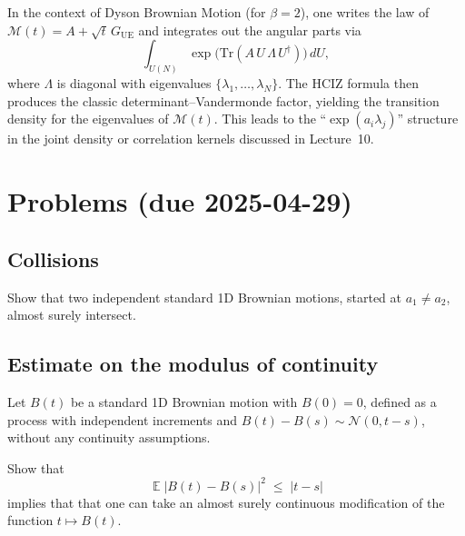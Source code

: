 \documentclass[letterpaper,11pt,oneside,reqno]{article}
\numberwithin{equation}{section}
\theoremstyle{definition}
\begin{document}
In the context of Dyson Brownian Motion (for \(\beta=2\)), one writes the law of
\(\mathcal{M}(t)=A+\sqrt{t}\,G_{\mathrm{UE}}\) and integrates out the angular parts via
\[
   \int_{U(N)}
   \exp\!\bigl(\mathrm{Tr}(A\,U\,\Lambda\,U^\dagger)\bigr)\,dU,
\]
where \(\Lambda\) is diagonal with eigenvalues \(\{\lambda_1,\dots,\lambda_N\}\).  The HCIZ formula then produces the classic determinant--Vandermonde factor, yielding the transition density for the eigenvalues of \(\mathcal{M}(t)\).  This leads to the ``\(\exp(a_i\lambda_j)\)'' structure in the joint density or correlation kernels discussed in Lecture~10.












\appendix
\setcounter{section}{9}
\section{Problems (due 2025-04-29)}

\subsection{Collisions}

Show that two independent standard 1D Brownian motions, started at $a_1\neq a_2$, almost surely intersect.

\subsection{Estimate on the modulus of continuity}

Let $B(t)$ be a standard 1D Brownian motion with $B(0)=0$,
defined as a process with independent increments and $B(t)-B(s)\sim \mathcal{N}(0,t-s)$,
without any continuity assumptions.

Show that
\begin{equation*}
	\operatorname{\mathbb{E}}|B(t)-B(s)|^2 \;\le\; |t-s|
\end{equation*}
implies that
that one can take an almost
surely continuous modification of the function $t\mapsto B(t)$.


\subsection{}
\end{document}
